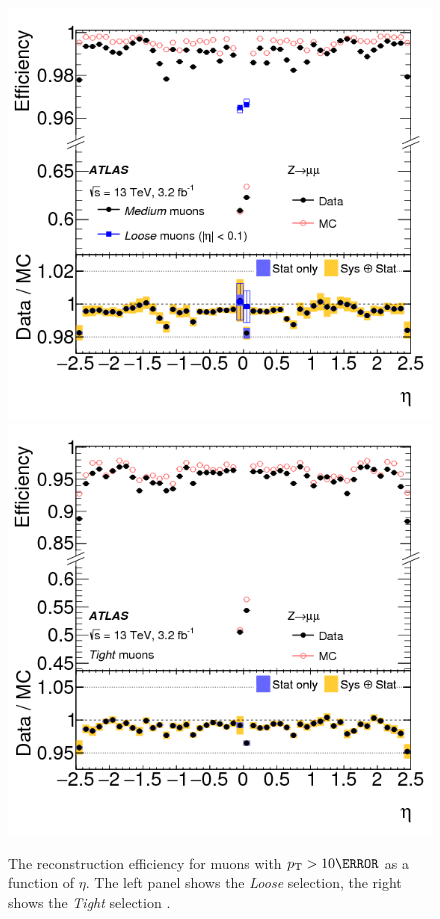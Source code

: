 \begin{figure}[!thp]
    \centering
    \includegraphics[width=.48\textwidth]{chapters/chapter3_eventreco/images/muon-medium.png}
    \includegraphics[width=.48\textwidth]{chapters/chapter3_eventreco/images/muon-tight.png}

    \caption[The reconstruction efficiency for \textit{Loose} and \textit{Tight} muons with $\pt >\unit{10}{\GeV}$ as a function of $\eta$.]
    {The reconstruction efficiency for muons with $\pt >\unit{10}{\GeV}$ as a function of $\eta$. The left panel shows the \textit{Loose} selection, the right shows the \textit{Tight} selection \cite{muon-reco}.}
    \label{fig:muon-eff}
\end{figure}
